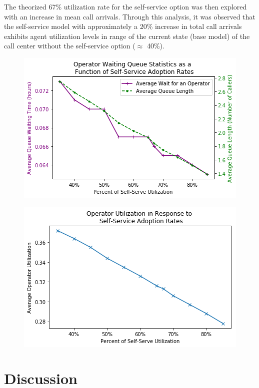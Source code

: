\documentclass[12pt]{article}
\begin{document}
	\par
	
	The theorized 67\% utilization rate for the self-service option was then explored with an increase in mean call arrivals.  Through this analysis, it was observed that the self-service model with approximately a 20\% increase in total call arrivals exhibits agent utilization levels in range of the current state (base model) of the call center without the self-service option ($\approx$ 40\%).

\begin{figure}[h]
	\includegraphics[scale=.5]{self_serve_results.png}
	\caption{}
\end{figure}


\begin{figure}[h]
	\includegraphics[scale=.5]{op_self_serve.png}
	\caption{}
\end{figure}



\section{Discussion}
\end{document}
